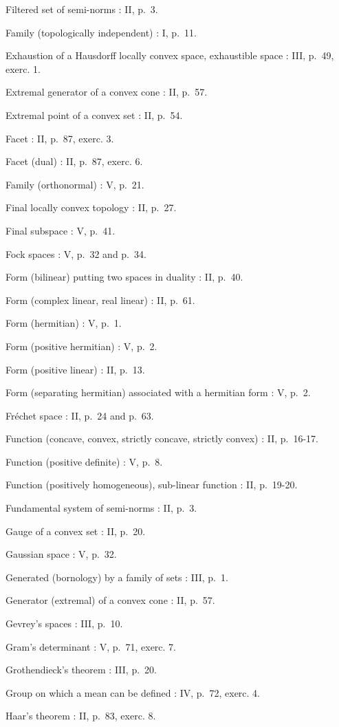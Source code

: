 Filtered set of semi-norms : II, p.~3.

Family (topologically independent) : I, p.~11.

Exhaustion of a Hausdorff locally convex space, exhaustible space : III, p.~49, exerc. 1.

Extremal generator of a convex cone : II, p.~57.

Extremal point of a convex set : II, p.~54.

Facet : II, p.~87, exerc. 3.

Facet (dual) : II, p.~87, exerc. 6.

Family (orthonormal) : V, p.~21.

Final locally convex topology : II, p.~27.

Final subspace : V, p.~41.

Fock spaces : V, p.~32 and p.~34.

Form (bilinear) putting two spaces in duality : II, p.~40.

Form (complex linear, real linear) : II, p.~61.

Form (hermitian) : V, p.~1.

Form (positive hermitian) : V, p.~2.

Form (positive linear) : II, p.~13.

Form (separating hermitian) associated with a hermitian form : V, p.~2.

Fréchet space : II, p.~24 and p.~63.

Function (concave, convex, strictly concave, strictly convex) : II, p.~16-17.

Function (positive definite) : V, p.~8.

Function (positively homogeneous), sub-linear function : II, p.~19-20.

Fundamental system of semi-norms : II, p.~3.

Gauge of a convex set : II, p.~20.

Gaussian space : V, p.~32.

Generated (bornology) by a family of sets : III, p.~1.

Generator (extremal) of a convex cone : II, p.~57.

Gevrey's spaces : III, p.~10.

Gram's determinant : V, p.~71, exerc. 7.

Grothendieck's theorem : III, p.~20.

Group on which a mean can be defined : IV, p.~72, exerc. 4.

Haar's theorem : II, p.~83, exerc. 8.

